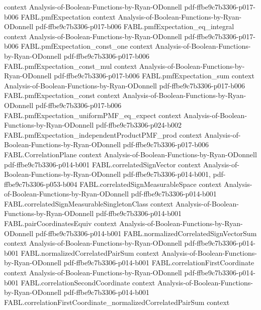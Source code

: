 \begin{theorem}
  {context}
  {Analysis-of-Boolean-Functions-by-Ryan-ODonnell}
  {pdf-ffbe9c7b3306-p017-b006}
\proofstep
  {FABL.pmfExpectation}
  {context}
  {Analysis-of-Boolean-Functions-by-Ryan-ODonnell}
  {pdf-ffbe9c7b3306-p017-b006}
\proofstep
  {FABL.pmfExpectation_eq_integral}
  {context}
  {Analysis-of-Boolean-Functions-by-Ryan-ODonnell}
  {pdf-ffbe9c7b3306-p017-b006}
\proofstep
  {FABL.pmfExpectation_const_one}
  {context}
  {Analysis-of-Boolean-Functions-by-Ryan-ODonnell}
  {pdf-ffbe9c7b3306-p017-b006}
\proofstep
  {FABL.pmfExpectation_const_mul}
  {context}
  {Analysis-of-Boolean-Functions-by-Ryan-ODonnell}
  {pdf-ffbe9c7b3306-p017-b006}
\proofstep
  {FABL.pmfExpectation_sum}
  {context}
  {Analysis-of-Boolean-Functions-by-Ryan-ODonnell}
  {pdf-ffbe9c7b3306-p017-b006}
\proofstep
  {FABL.pmfExpectation_const}
  {context}
  {Analysis-of-Boolean-Functions-by-Ryan-ODonnell}
  {pdf-ffbe9c7b3306-p017-b006}
\proofstep
  {FABL.pmfExpectation_uniformPMF_eq_expect}
  {context}
  {Analysis-of-Boolean-Functions-by-Ryan-ODonnell}
  {pdf-ffbe9c7b3306-p024-b002}
\proofstep
  {FABL.pmfExpectation_independentProductPMF_prod}
  {context}
  {Analysis-of-Boolean-Functions-by-Ryan-ODonnell}
  {pdf-ffbe9c7b3306-p017-b006}
\proofstep
  {FABL.CorrelationPlane}
  {context}
  {Analysis-of-Boolean-Functions-by-Ryan-ODonnell}
  {pdf-ffbe9c7b3306-p014-b001}
\proofstep
  {FABL.correlatedSignVector}
  {context}
  {Analysis-of-Boolean-Functions-by-Ryan-ODonnell}
  {pdf-ffbe9c7b3306-p014-b001,
    pdf-ffbe9c7b3306-p053-b004}
\proofstep
  {FABL.correlatedSignMeasurableSpace}
  {context}
  {Analysis-of-Boolean-Functions-by-Ryan-ODonnell}
  {pdf-ffbe9c7b3306-p014-b001}
\proofstep
  {FABL.correlatedSignMeasurableSingletonClass}
  {context}
  {Analysis-of-Boolean-Functions-by-Ryan-ODonnell}
  {pdf-ffbe9c7b3306-p014-b001}
\proofstep
  {FABL.pairCoordinatesEquiv}
  {context}
  {Analysis-of-Boolean-Functions-by-Ryan-ODonnell}
  {pdf-ffbe9c7b3306-p014-b001}
\proofstep
  {FABL.normalizedCorrelatedSignVectorSum}
  {context}
  {Analysis-of-Boolean-Functions-by-Ryan-ODonnell}
  {pdf-ffbe9c7b3306-p014-b001}
\proofstep
  {FABL.normalizedCorrelatedPairSum}
  {context}
  {Analysis-of-Boolean-Functions-by-Ryan-ODonnell}
  {pdf-ffbe9c7b3306-p014-b001}
\proofstep
  {FABL.correlationFirstCoordinate}
  {context}
  {Analysis-of-Boolean-Functions-by-Ryan-ODonnell}
  {pdf-ffbe9c7b3306-p014-b001}
\proofstep
  {FABL.correlationSecondCoordinate}
  {context}
  {Analysis-of-Boolean-Functions-by-Ryan-ODonnell}
  {pdf-ffbe9c7b3306-p014-b001}
\proofstep
  {FABL.correlationFirstCoordinate_normalizedCorrelatedPairSum}
  {context}

\end{theorem}
